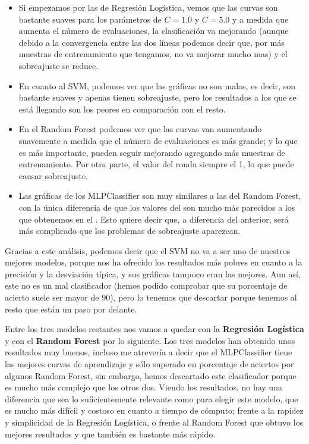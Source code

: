 \documentclass[11pt,a4paper]{article}
\begin{document}
\begin{itemize}[label=\textbullet]
\item Si empezamos por las de Regresión Logística, vemos que las curvas son bastante suaves  para los parámetros de $C = 1.0$ y $C = 5.0$ y a
medida que aumenta el número de evaluaciones, la clasificación va mejorando (aunque debido a la convergencia entre las dos líneas podemos
decir que, por más muestras de entrenamiento que tengamos, no va mejorar mucho mas) y el sobreajuste se reduce.

\item En cuanto al SVM, podemos ver que las gráficas no son malas, es decir, son bastante suaves y apenas tienen sobreajuste, pero los
resultados a
los que se está llegando son los peores en comparación con el resto.

\item En el Random Forest podemos ver que las curvas van aumentando suavemente a medida que el número de evaluaciones es más grande; y lo que es más importante, pueden seguir mejorando agregando más muestras de entrenamiento. Por otra parte, el valor del  ronda siempre el 1, lo que puede causar sobreajuste.

\item Las gráficas de los MLPClassifier son muy similares a las del Random Forest, con la única diferencia de que los valores del
 son mucho más parecidos a los que obtenemos en el . Esto quiere decir que, a diferencia del anterior, será más complicado que los problemas de sobreajuste aparezcan.
\end{itemize}
Gracias a este análisis, podemos decir que el SVM no va a ser uno de nuestros mejores modelos, porque nos ha ofrecido los resultados más
pobres en cuanto a la precisión y la desviación típica, y sus gráficas tampoco eran las mejores. Aun así, este no es un mal clasificador
(hemos podido comprobar que su porcentaje de acierto suele ser mayor de 90), pero lo tenemos que descartar porque tenemos al resto que
están un paso por delante.

Entre los tres modelos restantes nos vamos a quedar con la \textbf{Regresión Logística} y con el \textbf{Random Forest} por lo siguiente.
Los tres modelos han obtenido unos resultados muy buenos, incluso me atrevería a decir que el MLPClassifier tiene las mejores curvas de
aprendizaje y sólo superado en porcentaje de aciertos por algunos Random Forest, sin embargo, hemos descartado este clasificador porque es
mucho más complejo que los otros dos. Viendo los resultados, no hay una diferencia que sea lo suficientemente relevante como para elegir
este modelo, que es mucho más difícil y costoso en cuanto a tiempo de cómputo; frente a la rapidez y simplicidad de la Regresión Logística,
o frente al Random Forest que obtuvo los mejores resultados y que también es bastante más rápido.
\end{document}
